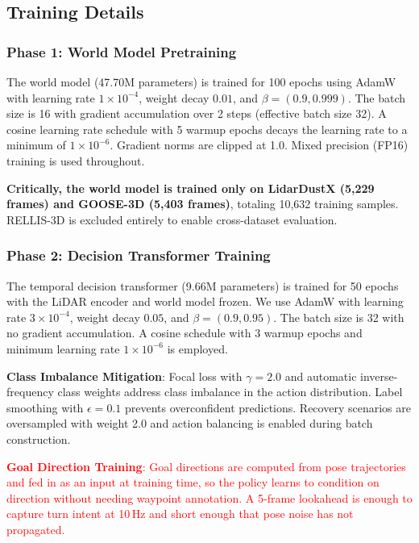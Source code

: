\documentclass[sensors,article,submit,pdftex,moreauthors]{Definitions/mdpi}
\begin{document}
\subsection{Training Details}

\subsubsection{Phase 1: World Model Pretraining}
The world model (47.70M parameters) is trained for 100 epochs using AdamW \cite{loshchilov2019} with learning rate $1 \times 10^{-4}$, weight decay $0.01$, and $\beta = (0.9, 0.999)$. The batch size is 16 with gradient accumulation over 2 steps (effective batch size 32). A cosine learning rate schedule with 5 warmup epochs decays the learning rate to a minimum of $1 \times 10^{-6}$. Gradient norms are clipped at 1.0. Mixed precision (FP16) training is used throughout.

\textbf{Critically, the world model is trained only on LidarDustX (5,229 frames) and GOOSE-3D (5,403 frames)}, totaling 10,632 training samples. RELLIS-3D is excluded entirely to enable cross-dataset evaluation.

\subsubsection{Phase 2: Decision Transformer Training}
The temporal decision transformer (9.66M parameters) is trained for 50 epochs with the LiDAR encoder and world model frozen. We use AdamW with learning rate $3 \times 10^{-4}$, weight decay $0.05$, and $\beta = (0.9, 0.95)$. The batch size is 32 with no gradient accumulation. A cosine schedule with 3 warmup epochs and minimum learning rate $1 \times 10^{-6}$ is employed.

\textbf{Class Imbalance Mitigation}: Focal loss with $\gamma = 2.0$ and automatic inverse-frequency class weights address class imbalance in the action distribution. Label smoothing with $\epsilon = 0.1$ prevents overconfident predictions. Recovery scenarios are oversampled with weight 2.0 and action balancing is enabled during batch construction.

\textcolor{red}{\textbf{Goal Direction Training}: Goal directions are computed from pose trajectories and fed in as an input at training time, so the policy learns to condition on direction without needing waypoint annotation. A 5-frame lookahead is enough to capture turn intent at 10\,Hz and short enough that pose noise has not propagated.}
\end{document}
